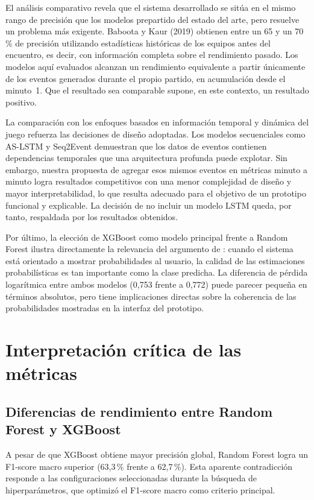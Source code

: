 El análisis comparativo revela que el sistema desarrollado se sitúa en el mismo rango de precisión que los modelos prepartido del estado del arte, pero resuelve un problema más exigente. Baboota y Kaur (2019) obtienen entre un 65 y un 70\,\% de precisión utilizando estadísticas históricas de los equipos antes del encuentro, es decir, con información completa sobre el rendimiento pasado. Los modelos aquí evaluados alcanzan un rendimiento equivalente a partir únicamente de los eventos generados durante el propio partido, en acumulación desde el minuto~1. Que el resultado sea comparable supone, en este contexto, un resultado positivo.

La comparación con los enfoques basados en información temporal y dinámica del juego refuerza las decisiones de diseño adoptadas. Los modelos secuenciales como AS-LSTM \citep{zhang2022lstm} y Seq2Event \citep{simpson2022seq2event} demuestran que los datos de eventos contienen dependencias temporales que una arquitectura profunda puede explotar. Sin embargo, nuestra propuesta de agregar esos mismos eventos en métricas minuto a minuto logra resultados competitivos con una menor complejidad de diseño y mayor interpretabilidad, lo que resulta adecuado para el objetivo de un prototipo funcional y explicable. La decisión de no incluir un modelo LSTM queda, por tanto, respaldada por los resultados obtenidos.

Por último, la elección de XGBoost como modelo principal frente a Random Forest ilustra directamente la relevancia del argumento de \cite{walsh2024calibration}: cuando el sistema está orientado a mostrar probabilidades al usuario, la calidad de las estimaciones probabilísticas es tan importante como la clase predicha. La diferencia de pérdida logarítmica entre ambos modelos (0,753 frente a 0,772) puede parecer pequeña en términos absolutos, pero tiene implicaciones directas sobre la coherencia de las probabilidades mostradas en la interfaz del prototipo.

\section{Interpretación crítica de las métricas}

\subsection{Diferencias de rendimiento entre Random Forest y XGBoost}

A pesar de que XGBoost obtiene mayor precisión global, Random Forest logra un F1-score macro superior (63,3\,\% frente a 62,7\,\%). Esta aparente contradicción responde a las configuraciones seleccionadas durante la búsqueda de hiperparámetros, que optimizó el F1-score macro como criterio principal.

